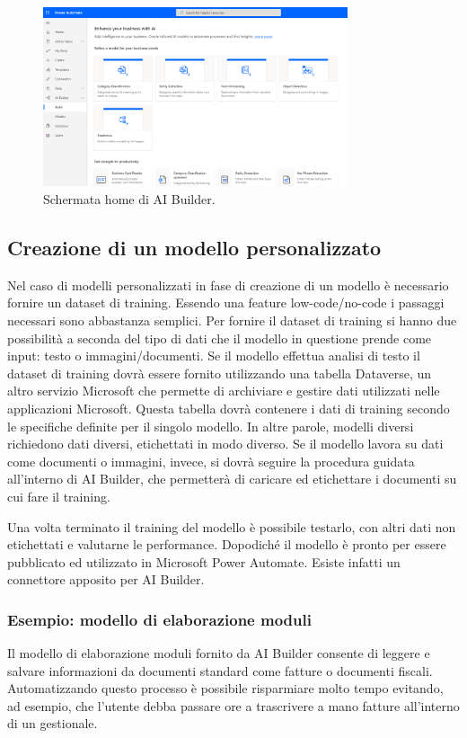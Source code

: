 \begin{figure}[ht!]
  \centering
  \includegraphics[width=0.8\textwidth]{ai-builder-home.png}
  \caption{Schermata home di AI Builder.}
  \label{fig:aiBuilderHome}
\end{figure}

\subsection{Creazione di un modello personalizzato}
\label{ssec:creazioneModello}
Nel caso di modelli personalizzati in fase di creazione di un modello è necessario fornire un dataset di training. Essendo una feature low-code/no-code i passaggi necessari sono abbastanza semplici. Per fornire il dataset di training si hanno due possibilità a seconda del tipo di dati che il modello in questione prende come input: testo o immagini/documenti. Se il modello effettua analisi di testo il dataset di training dovrà essere fornito utilizzando una tabella Dataverse, un altro servizio Microsoft che permette di archiviare e gestire dati utilizzati nelle applicazioni Microsoft. Questa tabella dovrà contenere i dati di training secondo le specifiche definite per il singolo modello. In altre parole, modelli diversi richiedono dati diversi, etichettati in modo diverso. 
Se il modello lavora su dati come documenti o immagini, invece, si dovrà seguire la procedura guidata all'interno di AI Builder, che permetterà di caricare ed etichettare i documenti su cui fare il training. 

Una volta terminato il training del modello è possibile testarlo, con altri dati non etichettati e valutarne le performance. Dopodiché il modello è pronto per essere pubblicato ed utilizzato in Microsoft Power Automate. Esiste infatti un connettore apposito per AI Builder.

\subsubsection{Esempio: modello di elaborazione moduli}
\label{sssec:esempioModello}
Il modello di elaborazione moduli fornito da AI Builder consente di leggere e salvare informazioni da documenti standard come fatture o documenti fiscali. Automatizzando questo processo è possibile risparmiare molto tempo evitando, ad esempio, che l'utente debba passare ore a trascrivere a mano fatture all'interno di un gestionale.

